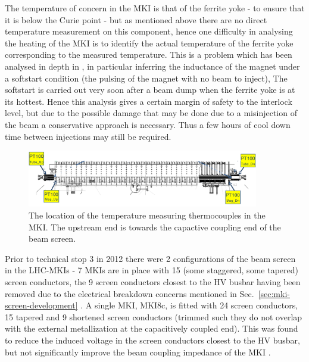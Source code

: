 The temperature of concern in the MKI is that of the ferrite yoke - to ensure that it is below the Curie point - but as mentioned above there are no direct temperature measurement on this component, hence one difficulty in analysing the heating of the MKI is to identify the actual temperature of the ferrite yoke corresponding to the measured temperature. This is a problem which has been analysed in depth in \cite{Barnes:mkiHeating}, in particular inferring the inductance of the magnet under a softstart condition (the pulsing of the magnet with no beam to inject), The softstart is carried out very soon after a beam dump when the ferrite yoke is at its hottest. Hence this analysis gives a certain margin of safety to the interlock level, but due to the possible damage that may be done due to a misinjection of the beam a conservative approach is necessary. Thus a few hours of cool down time between injections may still be required.

\begin{figure}
\begin{center}
\includegraphics[width=0.9\textwidth]{LHC_MKI/figures/pt100Loc.png}
\end{center}
\caption{The location of the temperature measuring thermocouples in the MKI. The upstream end is towards the capactive coupling end of the beam screen.}
\label{fig:mki-thermacouple-location}
\end{figure}

Prior to technical stop 3 in 2012 there were 2 configurations of the beam screen in the LHC-MKIs - 7 MKIs are in place with 15 (some staggered, some tapered) screen conductors, the 9 screen conductors closest to the HV busbar having been removed due to the electrical breakdown concerns mentioned in Sec.~\ref{sec:mki-screen-development} \cite{Barnes:improvBeamScreen}. A single MKI, MKI8c, is fitted with 24 screen conductors, 15 tapered and 9 shortened screen conductors (trimmed such they do not overlap with the external metallization at the capacitively coupled end). This was found to reduce the induced voltage in the screen conductors closest to the HV busbar, but not significantly improve the beam coupling impedance of the MKI \cite{Barnes:improvBeamScreen}.